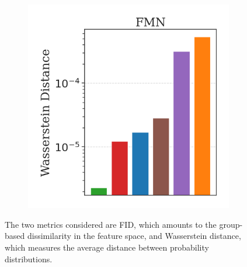 \begin{figure}[H]
\begin{subfigure}[b]{0.3\textwidth}
    \end{subfigure}
    \begin{subfigure}[b]{0.3\textwidth}
        \centering
        \includegraphics[width=\textwidth]{img/results_discussion/adversarial/W_barplot_FMN.png}
    \end{subfigure}

    \caption{
    The two metrics considered are FID, which amounts to the group-based dissimilarity 
    in the feature space, and Wasserstein distance, which measures the average distance between 
    probability distributions. 
    }
    \label{fig:adv_metric_comparison}
\end{figure}

